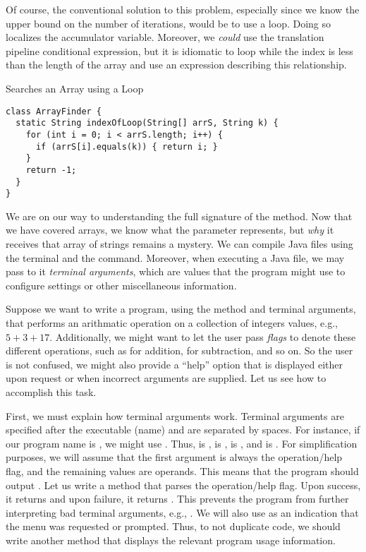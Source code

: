 Of course, the conventional solution to this problem, especially since we know the upper bound on the number of iterations, would be to use a  loop. Doing so localizes the accumulator variable. Moreover, we \textit{could} use the translation pipeline conditional expression, but it is idiomatic to loop while the index is less than the length of the array and use an expression describing this relationship.

\begin{cl}{Searches an Array using a  Loop}
\begin{lstlisting}[language=MyJava]
class ArrayFinder {
  static String indexOfLoop(String[] arrS, String k) {
    for (int i = 0; i < arrS.length; i++) {
      if (arrS[i].equals(k)) { return i; }
    }
    return -1;
  }
}
\end{lstlisting}
\end{cl}

We are on our way to understanding the full signature of the  method. Now that we have covered arrays, we know what the  parameter represents, but \textit{why} it receives that array of strings remains a mystery. We can compile Java files using the terminal and the  command. Moreover, when executing a Java file, we may pass to it \textit{terminal arguments}, which are values that the program might use to configure settings or other miscellaneous information.

\example Suppose we want to write a program, using the  method and terminal arguments, that performs an arithmatic operation on a collection of integers values, e.g., $5 + 3 + 17$. Additionally, we might want to let the user pass \textit{flags} to denote these different operations, such as  for addition,  for subtraction, and so on. So the user is not confused, we might also provide a ``help'' option that is displayed either upon request or when incorrect arguments are supplied. Let us see how to accomplish this task.

First, we must explain how terminal arguments work. Terminal arguments are specified after the executable (name) and are separated by spaces. For instance, if our program name is , we might use . Thus,  is ,  is ,  is , and  is . For simplification purposes, we will assume that the first argument is always the operation/help flag, and the remaining values are operands. This means that the program should output . Let us write a method that parses the operation/help flag. Upon success, it returns  and upon failure, it returns . This prevents the program from further interpreting bad terminal arguments, e.g., . We will also use  as an indication that the  menu was requested or prompted. Thus, to not duplicate code, we should write another method that displays the relevant program usage information.

